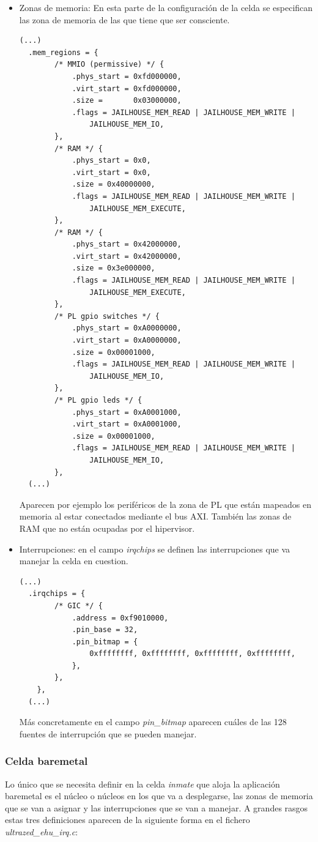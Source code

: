 \begin{itemize}
  \item Zonas de memoria: En esta parte de la configuración de la celda se especifican las zona de memoria de las que tiene que ser consciente.
  \begin{lstlisting}[style=CStyle]
  (...)
  .mem_regions = {
		/* MMIO (permissive) */ {
			.phys_start = 0xfd000000,
			.virt_start = 0xfd000000,
			.size =	      0x03000000,
			.flags = JAILHOUSE_MEM_READ | JAILHOUSE_MEM_WRITE |
				JAILHOUSE_MEM_IO,
		},
		/* RAM */ {
			.phys_start = 0x0,
			.virt_start = 0x0,
			.size = 0x40000000,
			.flags = JAILHOUSE_MEM_READ | JAILHOUSE_MEM_WRITE |
				JAILHOUSE_MEM_EXECUTE,
		},
		/* RAM */ {
			.phys_start = 0x42000000,
			.virt_start = 0x42000000,
			.size = 0x3e000000,
			.flags = JAILHOUSE_MEM_READ | JAILHOUSE_MEM_WRITE |
				JAILHOUSE_MEM_EXECUTE,
		},
		/* PL gpio switches */ {
			.phys_start = 0xA0000000,
			.virt_start = 0xA0000000,
			.size = 0x00001000,
			.flags = JAILHOUSE_MEM_READ | JAILHOUSE_MEM_WRITE |
				JAILHOUSE_MEM_IO,
		},
		/* PL gpio leds */ {
			.phys_start = 0xA0001000,
			.virt_start = 0xA0001000,
			.size = 0x00001000,
			.flags = JAILHOUSE_MEM_READ | JAILHOUSE_MEM_WRITE |
				JAILHOUSE_MEM_IO,
		},
  (...)
  \end{lstlisting}
  Aparecen por ejemplo los periféricos de la zona de \acrshort{PL} que están mapeados en memoria al estar conectados mediante el bus \acrshort{AXI}. También las zonas de \acrshort{RAM} que no están ocupadas por el hipervisor.

  \item Interrupciones: en el campo \textit{irqchips} se definen las interrupciones que va manejar la celda en cuestion.
  \begin{lstlisting}[style=CStyle]
  (...)
  .irqchips = {
		/* GIC */ {
			.address = 0xf9010000,
			.pin_base = 32,
			.pin_bitmap = {
				0xffffffff, 0xffffffff, 0xffffffff, 0xffffffff,
			},
		},
	},
  (...)
  \end{lstlisting}
  Más concretamente en el campo \textit{pin\_bitmap} aparecen cuáles de las 128 fuentes de interrupción que se pueden manejar.

\end{itemize}

\subsubsection{Celda baremetal} \label{jailhouse:baremetal}
Lo único que se necesita definir en la celda \textit{inmate} que aloja la aplicación baremetal es el núcleo o núcleos en los que va a desplegarse, las zonas de memoria que se van a asignar y las interrupciones que se van a manejar. A grandes rasgos estas tres definiciones aparecen de la siguiente forma en el fichero \textit{ultrazed\_ehu\_irq.c}:

